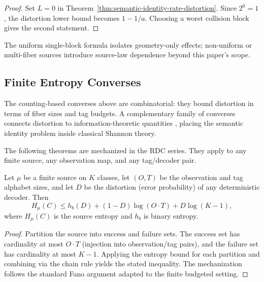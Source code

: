 \begin{proof}
Set $L=0$ in Theorem~\ref{thm:semantic-identity-rate-distortion}. Since $2^0=1$, the distortion lower bound becomes $1-1/a$. Choosing a worst collision block gives the second statement.
\end{proof}

\begin{remark}[Scope]
The uniform single-block formula isolates geometry-only effects; non-uniform or multi-fiber sources introduce source-law dependence beyond this paper's scope.
\end{remark}

\subsection{Finite Entropy Converses}\label{sec:entropy-converses}

The counting-based converses above are combinatorial: they bound distortion in terms of fiber sizes and tag budgets. A complementary family of converses connects distortion to information-theoretic quantities \cite{CoverThomas2006,csiszar2011information,barron1998information}, placing the semantic identity problem inside classical Shannon theory.

The following theorems are mechanized in the RDC series. They apply to any finite source, any observation map, and any tag/decoder pair. 

\begin{theorem}\label{thm:fano-converse}
Let $\mu$ be a finite source on $K$ classes, let $(O, T)$ be the observation and tag alphabet sizes, and let $D$ be the distortion (error probability) of any deterministic decoder. Then
\[
H_\mu(C) \le h_b(D) + (1-D) \log(O \cdot T) + D \log(K - 1),
\]
where $H_\mu(C)$ is the source entropy and $h_b$ is binary entropy.
\end{theorem}

\begin{proof}
Partition the source into success and failure sets. The success set has cardinality at most $O \cdot T$ (injection into observation/tag pairs), and the failure set has cardinality at most $K-1$. Applying the entropy bound for each partition and combining via the chain rule yields the stated inequality. The mechanization follows the standard Fano argument adapted to the finite budgeted setting.
\end{proof}

